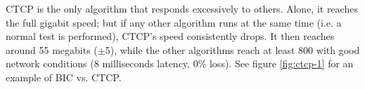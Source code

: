 \documentclass{article}
\begin{document}
\begin{figure}[H]
\end{figure}

CTCP is the only algorithm that responds excessively to others. Alone, it
reaches the full gigabit speed; but if any other algorithm runs at the same
time (i.e. a normal test is performed), CTCP's speed consistently drops. It
then reaches around 55 megabits ($\pm$5), while the other algorithms reach at %
least 800 with good network conditions (8 milliseconds latency, 0\% loss).
See figure \ref{fig:ctcp-1} for an example of BIC vs. CTCP.
\end{document}

